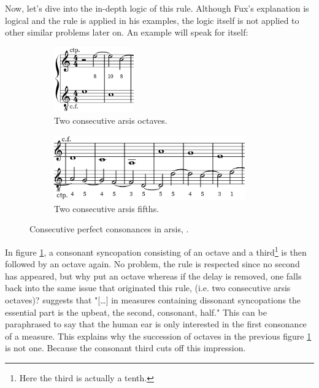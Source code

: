 \begin{enumerate}[wide, label=\bfseries 4.P\arabic*]
    Now, let's dive into the in-depth logic of this rule. Although Fux's explanation is logical and the rule is applied in his examples, the logic itself is not applied to other similar problems later on. An example will speak for itself:
    \begin{figure}[h]
        \centering
        \begin{subfigure}{.4\textwidth}
            \centering
            \includegraphics[height=1.1in]{Images/consecutives_octaves.png}
            \caption{Two consecutive arsis octaves.}
            \label{fig:twoarsisoctaves}
        \end{subfigure}%
        \begin{subfigure}{.6\textwidth}
            \centering
            \includegraphics[height=1.1in]{Images/consecutives_fifths.png}
            \caption{Two consecutive arsis fifths.}
            \label{fig:twoarsisfifths}
        \end{subfigure}
        \caption{Consecutive perfect consonances in arsis, .}
    \end{figure}

    In figure \ref{fig:twoarsisoctaves}, a consonant syncopation consisting of an octave and a third\footnote{Here the third is actually a tenth.} is then followed by an octave again. No problem, the rule is respected since no second has appeared, but why put an octave whereas if the delay is removed, one falls back into the same issue that originated this rule, (i.e. two consecutive arsis octaves)? \textcite[p.95]{GaPEng} suggests that "[\dots] in measures containing dissonant syncopations the essential part is the upbeat, the second, consonant, half." This can be paraphrased to say that the human ear is only interested in the first consonance of a measure. This explains why the succession of octaves in the previous figure \ref{fig:twoarsisoctaves} is not one. Because the consonant third cuts off this impression.
    

\end{enumerate}
